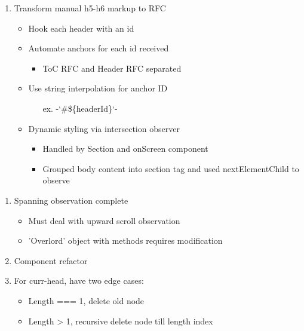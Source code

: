 \documentclass[7px]{article}
\begin{document}
\deploy
{
  \small
  \begin{enumerate}[label=$\multimapinv$]
    \item Transform manual h5-h6 markup to RFC
      \begin{itemize}[label=$\multimapdot$, leftmargin=1.7mm]
        \item Hook each header with an id
        \item Automate anchors for each id received
          \begin{itemize}
            \item ToC RFC and Header RFC separated
          \end{itemize}
        \item Use string interpolation for anchor ID
          \begin{itemize}
            \item[ex.] -`\#\$\{headerId\}`-
          \end{itemize}
        \item Dynamic styling via intersection observer
          \begin{itemize}[label=$\multimapdot$, leftmargin=1.7mm]
            \item Handled by Section and onScreen component
            \item Grouped body content into section tag and used nextElementChild to observe
          \end{itemize}
      \end{itemize}
  \end{enumerate}
  \normalsize
}
{
  \begin{enumerate}
    \item Spanning observation complete
      \begin{itemize}
        \item Must deal with upward scroll observation
        \item 'Overlord' object with methods requires modification
      \end{itemize}
    \item Component refactor
    \item For curr-head, have two edge cases:
      \begin{itemize}
        \item Length === 1, delete old node
        \item Length > 1, recursive delete node till length index
      \end{itemize}
  \end{enumerate}
}

\end{document}
